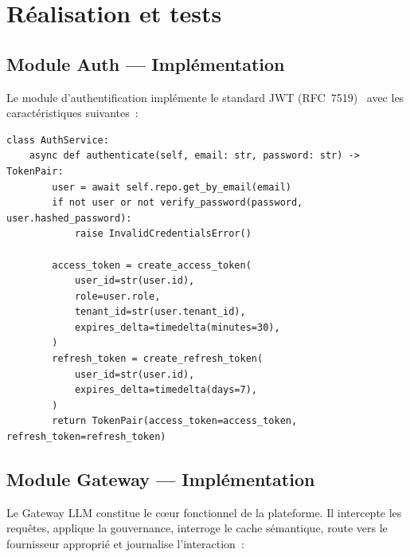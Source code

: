 \section{Réalisation et tests}
\label{sec:s1_realisation}

\subsection{Module Auth --- Implémentation}

Le module d'authentification implémente le standard JWT (RFC~7519)~\cite{rfc7519} avec les caractéristiques suivantes~:

\begin{lstlisting}[language=Python3, caption={Extrait du service d'authentification (modules/auth/service.py)}]
class AuthService:
    async def authenticate(self, email: str, password: str) -> TokenPair:
        user = await self.repo.get_by_email(email)
        if not user or not verify_password(password, user.hashed_password):
            raise InvalidCredentialsError()
        
        access_token = create_access_token(
            user_id=str(user.id),
            role=user.role,
            tenant_id=str(user.tenant_id),
            expires_delta=timedelta(minutes=30),
        )
        refresh_token = create_refresh_token(
            user_id=str(user.id),
            expires_delta=timedelta(days=7),
        )
        return TokenPair(access_token=access_token, refresh_token=refresh_token)
\end{lstlisting}

\subsection{Module Gateway --- Implémentation}

Le Gateway LLM constitue le c\oe ur fonctionnel de la plateforme. Il intercepte les requêtes, applique la gouvernance, interroge le cache sémantique, route vers le fournisseur approprié et journalise l'interaction~:

